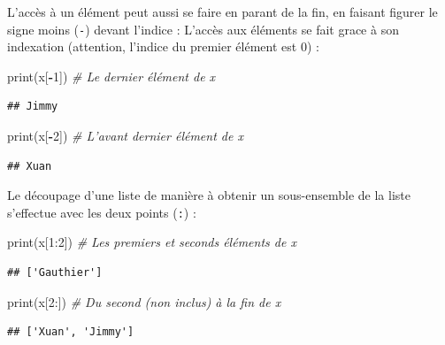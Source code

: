 \documentclass[12pt,]{book}
\newenvironment{Shaded}{\begin{snugshade}}{\end{snugshade}}
\newcommand{\DecValTok}[1]{\textcolor[rgb]{0.00,0.00,0.81}{#1}}
\newcommand{\CommentTok}[1]{\textcolor[rgb]{0.56,0.35,0.01}{\textit{#1}}}
\newcommand{\OperatorTok}[1]{\textcolor[rgb]{0.81,0.36,0.00}{\textbf{#1}}}
\newcommand{\BuiltInTok}[1]{#1}
\newcommand{\NormalTok}[1]{#1}
\numberwithin{equation}{section}
\numberwithin{countremarque}{section}
\begin{document}
L'accès à un élément peut aussi se faire en parant de la fin, en faisant
figurer le signe moins (\texttt{-}) devant l'indice : L'accès aux
éléments se fait grace à son indexation (attention, l'indice du premier
élément est 0) :

\begin{Shaded}
\begin{Highlighting}[]
\BuiltInTok{print}\NormalTok{(x[}\OperatorTok{-}\DecValTok{1}\NormalTok{]) }\CommentTok{# Le dernier élément de x}
\end{Highlighting}
\end{Shaded}

\begin{lstlisting}
## Jimmy
\end{lstlisting}

\begin{Shaded}
\begin{Highlighting}[]
\BuiltInTok{print}\NormalTok{(x[}\OperatorTok{-}\DecValTok{2}\NormalTok{]) }\CommentTok{# L'avant dernier élément de x}
\end{Highlighting}
\end{Shaded}

\begin{lstlisting}
## Xuan
\end{lstlisting}

Le découpage d'une liste de manière à obtenir un sous-ensemble de la
liste s'effectue avec les deux points (\texttt{:}) :

\begin{Shaded}
\begin{Highlighting}[]
\BuiltInTok{print}\NormalTok{(x[}\DecValTok{1}\NormalTok{:}\DecValTok{2}\NormalTok{]) }\CommentTok{# Les premiers et seconds éléments de x}
\end{Highlighting}
\end{Shaded}

\begin{lstlisting}
## ['Gauthier']
\end{lstlisting}

\begin{Shaded}
\begin{Highlighting}[]
\BuiltInTok{print}\NormalTok{(x[}\DecValTok{2}\NormalTok{:]) }\CommentTok{# Du second (non inclus) à la fin de x}
\end{Highlighting}
\end{Shaded}

\begin{lstlisting}
## ['Xuan', 'Jimmy']
\end{lstlisting}
\end{document}
